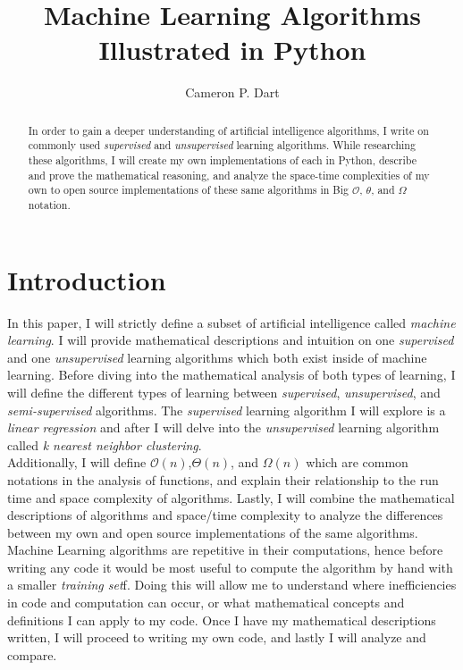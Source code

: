 \documentclass[a4paper]{article}
\title{Machine Learning Algorithms Illustrated in Python}
\author{Cameron P. Dart}
\begin{document}
\maketitle
\begin{abstract}
In order to gain a deeper understanding of artificial intelligence algorithms, I write on commonly used \textit{supervised} and \textit{unsupervised} learning algorithms. While researching these algorithms, I will create my own implementations of each in Python, describe and prove the mathematical reasoning, and analyze the space-time complexities of my own to open source implementations of these same algorithms in Big $\mathcal{O}$, $\theta$, and $\Omega$ notation.
\end{abstract}

\section{Introduction}
In this paper, I will strictly define a subset of artificial intelligence called \textit{machine learning}. I will provide mathematical descriptions and intuition on one \textit{supervised} and one \textit{unsupervised} learning algorithms which both exist inside of machine learning. Before diving into the mathematical analysis of both types of learning, I will define the different types of learning between \textit{supervised}, \textit{unsupervised}, and \textit{semi-supervised} algorithms. The \textit{supervised} learning algorithm I will explore is a \textit{linear regression} and after I will delve into the \textit{unsupervised} learning algorithm called \textit{k nearest neighbor clustering}.\\
 Additionally, I will define $\mathcal{O}(n)$,$\Theta(n)$, and $\Omega(n)$ which are common notations in the analysis of functions, and explain their relationship to the run time and space complexity of algorithms. Lastly, I will combine the mathematical descriptions of algorithms and space/time complexity to analyze the differences between my own and open source implementations of the same algorithms. \\
 Machine Learning algorithms are repetitive in their computations, hence before writing any code it would be most useful to compute the algorithm by hand with a smaller \textit{training set}f. Doing this will allow me to understand where inefficiencies in code and computation can occur, or what mathematical concepts and definitions I can apply to my code. Once I have my mathematical descriptions written, I will proceed to writing my own code, and lastly I will analyze and compare. 
\end{document}
